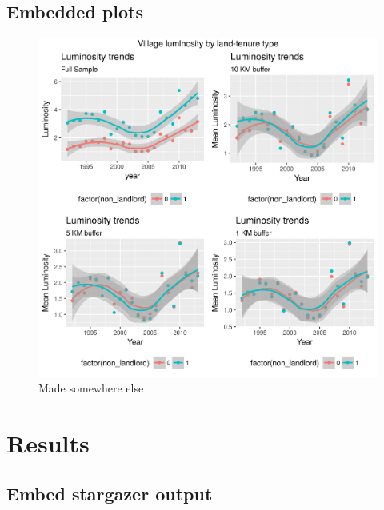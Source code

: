 \documentclass[12pt,]{article}
\begin{document}
\newpage

\hypertarget{embedded-plots}{%
\subsection{Embedded plots}\label{embedded-plots}}

\begin{figure}
\centering
\includegraphics{Figs/luminosity_grid.png}
\caption{Made somewhere else}
\end{figure}

\newpage

\hypertarget{results}{%
\section{Results}\label{results}}

\hypertarget{embed-stargazer-output}{%
\subsection{Embed stargazer output}\label{embed-stargazer-output}}
\end{document}
